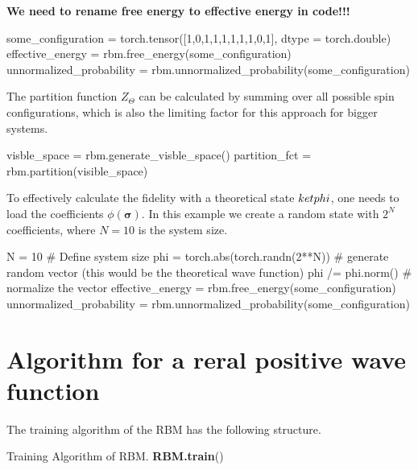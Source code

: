 \documentclass[submission, Phys]{SciPost}
\begin{document}
\textbf{We need to rename free energy to effective energy in code!!!}

\begin{python}
some_configuration = torch.tensor([1,0,1,1,1,1,1,1,0,1], dtype = torch.double)
effective_energy = rbm.free_energy(some_configuration)
unnormalized_probability = rbm.unnormalized_probability(some_configuration) 
\end{python}

The partition function $Z_{\Theta}$ can be calculated by summing over all possible spin configurations, which is also the limiting factor for this approach for bigger systems.

\begin{python}
visble_space = rbm.generate_visble_space()
partition_fct = rbm.partition(visible_space)
\end{python}

To effectively calculate the fidelity with a theoretical state $\\ket{phi}$, one needs to load the coefficients $\phi(\bm{\sigma})$. In this example we create a random state with $2^N$ coefficients, where $N=10$ is the system size.

\begin{python}
N = 10 # Define system size
phi =  torch.abs(torch.randn(2**N)) # generate random vector (this would be the theoretical wave function)
phi /= phi.norm() # normalize the vector
effective_energy = rbm.free_energy(some_configuration)
unnormalized_probability = rbm.unnormalized_probability(some_configuration) 
\end{python}


\section{Algorithm for a reral positive wave function}
The training algorithm of the RBM has the following structure.
 
\begin{algorithm}[H]
	 \caption{Training Algorithm of RBM. \textbf{RBM.train}() }
  \SetAlgoLined
 
\end{algorithm}
\end{document}
